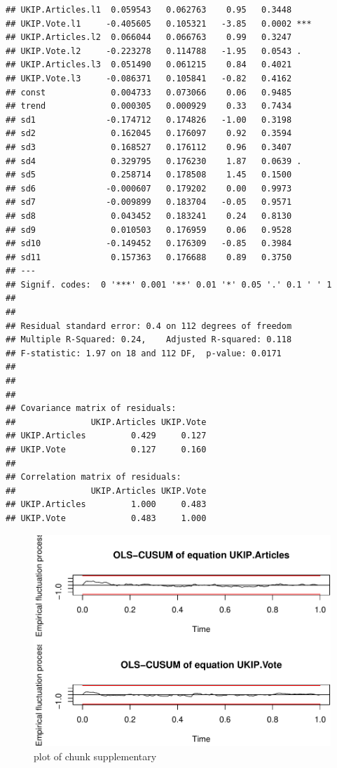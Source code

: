 \documentclass[12pt,article]{article}
\begin{document}
\begin{verbatim}
## UKIP.Articles.l1  0.059543   0.062763    0.95   0.3448    
## UKIP.Vote.l1     -0.405605   0.105321   -3.85   0.0002 ***
## UKIP.Articles.l2  0.066044   0.066763    0.99   0.3247    
## UKIP.Vote.l2     -0.223278   0.114788   -1.95   0.0543 .  
## UKIP.Articles.l3  0.051490   0.061215    0.84   0.4021    
## UKIP.Vote.l3     -0.086371   0.105841   -0.82   0.4162    
## const             0.004733   0.073066    0.06   0.9485    
## trend             0.000305   0.000929    0.33   0.7434    
## sd1              -0.174712   0.174826   -1.00   0.3198    
## sd2               0.162045   0.176097    0.92   0.3594    
## sd3               0.168527   0.176112    0.96   0.3407    
## sd4               0.329795   0.176230    1.87   0.0639 .  
## sd5               0.258714   0.178508    1.45   0.1500    
## sd6              -0.000607   0.179202    0.00   0.9973    
## sd7              -0.009899   0.183704   -0.05   0.9571    
## sd8               0.043452   0.183241    0.24   0.8130    
## sd9               0.010503   0.176959    0.06   0.9528    
## sd10             -0.149452   0.176309   -0.85   0.3984    
## sd11              0.157363   0.176688    0.89   0.3750    
## ---
## Signif. codes:  0 '***' 0.001 '**' 0.01 '*' 0.05 '.' 0.1 ' ' 1
## 
## 
## Residual standard error: 0.4 on 112 degrees of freedom
## Multiple R-Squared: 0.24,    Adjusted R-squared: 0.118 
## F-statistic: 1.97 on 18 and 112 DF,  p-value: 0.0171 
## 
## 
## 
## Covariance matrix of residuals:
##               UKIP.Articles UKIP.Vote
## UKIP.Articles         0.429     0.127
## UKIP.Vote             0.127     0.160
## 
## Correlation matrix of residuals:
##               UKIP.Articles UKIP.Vote
## UKIP.Articles         1.000     0.483
## UKIP.Vote             0.483     1.000
\end{verbatim}

\begin{figure}[htbp]
\centering
\includegraphics{ukip_media_files/figure-latex/supplementary.pdf}
\caption{plot of chunk supplementary}
\end{figure}
\end{document}

